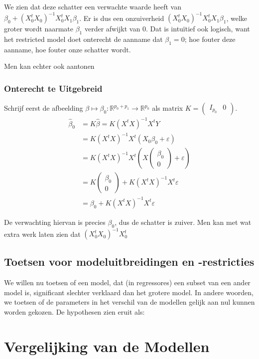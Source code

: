 \documentclass[a4paper]{report}
\begin{document}
  We zien dat deze schatter een verwachte waarde heeft van $\beta_0 + (X_0^tX_0)^{-1}X_0^tX_1\beta_1$. Er is dus een onzuiverheid $(X_0^tX_0)^{-1}X_0^tX_1\beta_1$, welke groter wordt naarmate $\beta_1$ verder afwijkt van $0$. Dat is intu\"itief ook logisch, want het restricted model doet onterecht de aanname dat $\beta_1=0$; hoe fouter deze aanname, hoe fouter onze schatter wordt.
  
  Men kan echter ook aantonen
  
\subsection{Onterecht te Uitgebreid}
  Schrijf eerst de afbeelding $\beta \mapsto \beta_0: \mathbb{R}^{p_0+p_1} \rightarrow \mathbb{R}^{p_0}$ als matrix $K = \begin{pmatrix} I_{p_0} & 0 \end{pmatrix}$. 
  \begin{align*}
  \hat{\beta}_0 &= K\hat{\beta} = K(X^tX)^{-1}X^tY \\ 
  &= K(X^tX)^{-1}X^t(X_0\beta_0 + \varepsilon) \\
  &= K(X^tX)^{-1}X^t(X\begin{pmatrix} \beta_0 \\ 0 \end{pmatrix} + \varepsilon) \\
  &= K \begin{pmatrix} \beta_0 \\ 0 \end{pmatrix} + K(X^tX)^{-1}X^t\varepsilon \\
  &= \beta_0 + K(X^tX)^{-1}X^t\varepsilon 
  \end{align*}
  
  De verwachting hiervan is precies $\beta_0$, dus de schatter is zuiver.
  Men kan met wat extra werk laten zien dat $(X_0^tX_0)^{-1}X_0^t$ 

\section{Toetsen voor modeluitbreidingen en -restricties}

  We willen nu toetsen of een model, dat (in regressores) een subset van een ander model is, significant slechter verklaard dan het grotere model. In andere woorden, we toetsen of de parameters in het verschil van de modellen gelijk aan nul kunnen worden gekozen. De hypothesen zien eruit als:
  
\chapter{Vergelijking van de Modellen}

\

  
\end{document}
